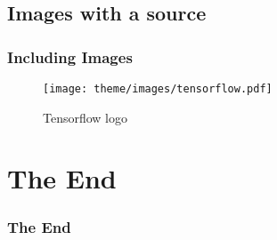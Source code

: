 \documentclass{beamer}
\begin{document}
\subsection{Images with a source}
\begin{frame}
	\frametitle{Including Images}
	\begin{figure}
		\centering
		\texttt{[image: theme/images/tensorflow.pdf]}
		\caption{Tensorflow logo}
	\end{figure}
\end{frame}


\section{The End}
\begin{frame}
	\frametitle{The End}
\end{frame}
\end{document}
